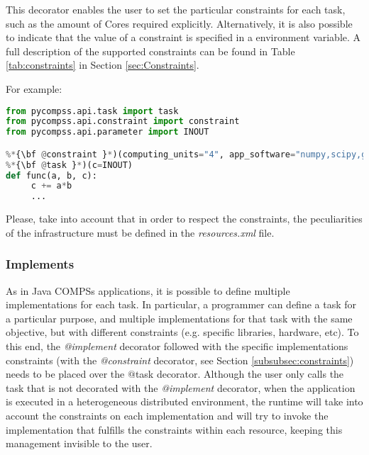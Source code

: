 This decorator enables the user to set the particular constraints for each task, such as the amount of Cores required explicitly.
Alternatively, it is also possible to indicate that the value of a constraint is specified in a environment variable.
A full description of the supported constraints can be found in Table \ref{tab:constraints} in Section \ref{sec:Constraints}.

For example:

\begin{lstlisting}[language=python]
from pycompss.api.task import task
from pycompss.api.constraint import constraint
from pycompss.api.parameter import INOUT

%*{\bf @constraint }*)(computing_units="4", app_software="numpy,scipy,gnuplot", memory_size="$MIN_MEM_REQ")
%*{\bf @task }*)(c=INOUT)
def func(a, b, c):
     c += a*b
     ...
\end{lstlisting}

Please, take into account that in order to respect the constraints, the peculiarities of the infrastructure must be defined in the {\it resources.xml} file.


\subsubsection{Implements}

As in Java COMPSs applications, it is possible to define multiple implementations for each task.
In particular, a programmer can define a task for a particular purpose, and multiple implementations for that task
with the same objective, but with different constraints (e.g. specific libraries, hardware, etc). 
To this end, the {\it @implement} decorator followed with the specific implementations constraints (with the 
{\it @constraint} decorator, see Section \ref{subsubsec:constraints}) needs to be placed over the $@$task decorator.
Although the user only calls the task that is not decorated with the {\it @implement} decorator, when the application 
is executed in a heterogeneous distributed environment, the runtime will take into account the constraints on each 
implementation  and will try to invoke the implementation that fulfills the constraints within each resource, 
keeping this management invisible to the user.


